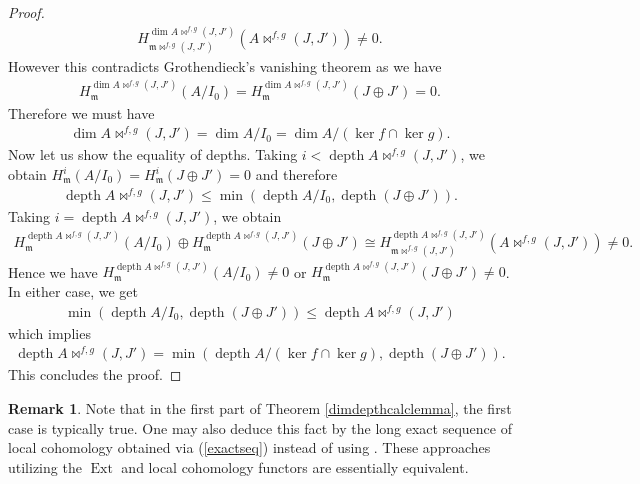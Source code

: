 \documentclass{amsart}%
\theoremstyle{plain}
\numberwithin{equation}{section}
\theoremstyle{definition}
\newtheorem{remark}{Remark}[section]
\DeclareMathOperator{\depth}{depth}
\DeclareMathOperator{\ext}{Ext}
\begin{document}
\begin{proof}
\begin{align*}
            H^{\dim A\bowtie^{f,g}(J,J')}_{\mathfrak{m}\bowtie^{f,g}(J,J')}\left(A\bowtie^{f,g}(J,J')\right)\neq 0.
        \end{align*}
        However this contradicts Grothendieck's vanishing theorem as we have
        \begin{align*}
            H^{\dim A\bowtie^{f,g}(J,J')}_{\mathfrak{m}}(A/I_0)=H^{\dim A\bowtie^{f,g}(J,J')}_{\mathfrak{m}}(J\oplus J')=0.
        \end{align*}
        Therefore we must have
        \begin{align*}
            \dim A\bowtie^{f,g}(J,J')=\dim A/I_0=\dim A/(\ker f\cap \ker g).
        \end{align*}
        Now let us show the equality of depths. Taking $i<\depth A\bowtie^{f,g}(J,J')$, we obtain $H^i_{\mathfrak{m}}(A/I_0)= H^i_{\mathfrak{m}}(J\oplus J')=0$ and therefore
        \begin{align*}
            \depth A\bowtie^{f,g}(J,J')\le \min( \depth A/I_0,\depth (J\oplus J')).
        \end{align*}
        Taking $i=\depth A\bowtie^{f,g}(J,J')$, we obtain 
        \begin{align*}
            H^{\depth A\bowtie^{f,g}(J,J')}_{\mathfrak{m}}(A/I_0)\oplus H^{\depth A\bowtie^{f,g}(J,J')}_{\mathfrak{m}}(J\oplus J')\cong H^{\depth A\bowtie^{f,g}(J,J')}_{\mathfrak{m}\bowtie^{f,g}(J,J')}\left(A\bowtie^{f,g}(J,J')\right)\neq 0.
        \end{align*}
        Hence we have $H^{\depth A\bowtie^{f,g}(J,J')}_{\mathfrak{m}}(A/I_0)\neq 0$ or $H^{\depth A\bowtie^{f,g}(J,J')}_{\mathfrak{m}}(J\oplus J')\neq 0$. In either case, we get
        \begin{align*}
            \min( \depth A/I_0,\depth (J\oplus J'))\le \depth A\bowtie^{f,g}(J,J')
        \end{align*}
        which implies
        \begin{align*}
            \depth A\bowtie^{f,g}(J,J')=\min( \depth A/(\ker f\cap \ker g),\depth (J\oplus J')).
        \end{align*}
        This concludes the proof.
\end{proof}

\begin{remark}
    Note that in the first part of Theorem \ref{dimdepthcalclemma}, the first case is typically true. One may also deduce this fact by the long exact sequence of local cohomology obtained via (\ref{exactseq}) instead of using \cite[Proposition 1.2.9]{brunsherzog}. These approaches utilizing the $\ext$ and local cohomology functors are essentially equivalent.
\end{remark}
\end{document}
